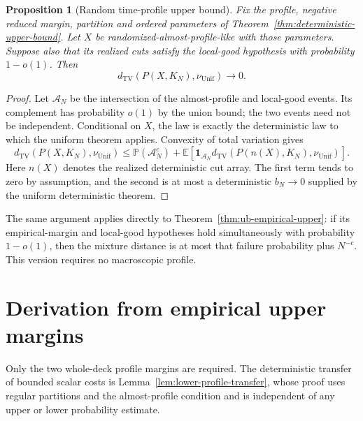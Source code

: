 \documentclass[11pt]{article}
\numberwithin{equation}{section}
\newtheorem{proposition}[proposition]{Proposition}
\newcommand{\TV}{\mathrm{TV}}
\newcommand{\Unif}{\mathrm{Unif}}
\newcommand{\E}{\mathbb E}
\newcommand{\Pp}{\mathbb P}
\newcommand{\1}{\mathbf 1}
\newcommand{\nuUnif}{\nu_{\Unif}}
\begin{document}
\begin{proposition}[Random time-profile upper bound]
\label{cor:random-time-profile-upper-bound}
Fix the profile, negative reduced margin, partition and ordered
parameters of Theorem~\ref{thm:deterministic-upper-bound}.  Let $X$
be randomized-almost-profile-like with those parameters.  Suppose
also that its realized cuts satisfy the local-good hypothesis with
probability $1-o(1)$.  Then
\[
 d_{\TV}(P(X,K_N),\nuUnif)\longrightarrow0.
\]
\end{proposition}
\begin{proof}
Let $\mathcal A_N$ be the intersection of the almost-profile and
local-good events.  Its complement has probability $o(1)$ by the
union bound; the two events need not be independent.  Conditional
on $X$, the law is exactly the deterministic law to which the
uniform theorem applies.  Convexity of total variation gives
\[
 d_{\TV}(P(X,K_N),\nuUnif)
 \le\Pp(\mathcal A_N^c)+
       \E\!\left[\mathbf1_{\mathcal A_N}
                    d_{\TV}(P(n(X),K_N),\nuUnif)\right].
\]
Here $n(X)$ denotes the realized deterministic cut array.  The first
term tends to zero by assumption, and the second is at most a
deterministic $b_N\to0$ supplied by the uniform deterministic theorem.
\end{proof}

The same argument applies directly to
Theorem~\ref{thm:ub-empirical-upper}: if its empirical-margin and
local-good hypotheses hold simultaneously with probability $1-o(1)$,
then the mixture distance is at most that failure probability plus
$N^{-c}$.  This version requires no macroscopic profile.


\section{Derivation from empirical upper margins}
\label{sec:buffered-upper-bound-derivation}

Only the two whole-deck profile margins are required.  The deterministic
transfer of bounded scalar costs is
Lemma~\ref{lem:lower-profile-transfer}, whose proof uses regular
partitions and the almost-profile condition and is independent of any
upper or lower probability estimate.
\end{document}
